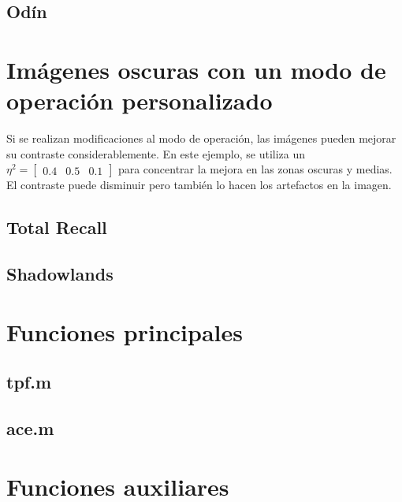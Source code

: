 \documentclass[10pt,a4paper]{article}
\begin{document}
			\subsection{Odín}

		\section{Imágenes oscuras con un modo de operación personalizado}
			Si se realizan modificaciones al modo de operación, las imágenes pueden mejorar su contraste considerablemente. En este ejemplo, se utiliza un $\eta^2 = \begin{bmatrix} 0.4 & 0.5 & 0.1\end{bmatrix}$ para concentrar la mejora en las zonas oscuras y medias. El contraste puede disminuir pero también lo hacen los artefactos en la imagen.
			\subsection{Total Recall}
			\subsection{Shadowlands}

		\pagebreak
		\section{Funciones principales}
			\subsection{tpf.m}
				
			\subsection{ace.m}
				
%
		\section{Funciones auxiliares}
\end{document}
